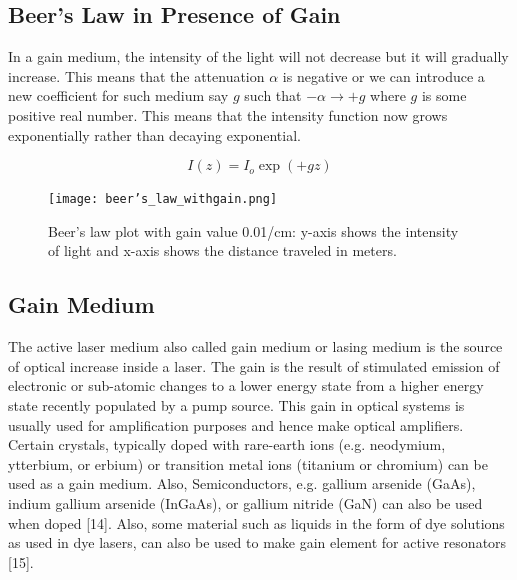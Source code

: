 \subsection{Beer's Law in Presence of Gain}
In a gain medium, the intensity of the light will not decrease but it will gradually increase. This means that the attenuation $\alpha$ is negative or we can introduce a new coefficient for such medium say $g$ such that $-\alpha \to +g$ where $g$ is some positive real number. This means that the intensity function now grows exponentially rather than decaying exponential.

\begin{equation}
I(z) = I_{o}\exp( +g z)
\end{equation}

\begin{figure}[h]
\centering
\texttt{[image: beer's\_law\_withgain.png]}
\caption{Beer's law plot with gain value 0.01/cm: y-axis shows the intensity of light and x-axis shows the distance traveled in meters.}
\end{figure}

\subsection{Gain Medium}
The active laser medium also called gain medium or lasing medium is the source of optical increase inside a laser. The gain is the result of stimulated emission of electronic or sub-atomic changes to a lower energy state from a higher energy state recently populated by a pump source. This gain in optical systems is usually used for amplification purposes and hence make optical amplifiers. Certain crystals, typically doped with rare-earth ions (e.g. neodymium, ytterbium, or erbium) or transition metal ions (titanium or chromium) can be used as a gain medium. Also, Semiconductors, e.g. gallium arsenide (GaAs), indium gallium arsenide (InGaAs), or gallium nitride (GaN) can also be used when doped [14]. Also, some material such as liquids in the form of dye solutions as used in dye lasers, can also be used to make gain element for active resonators [15].


